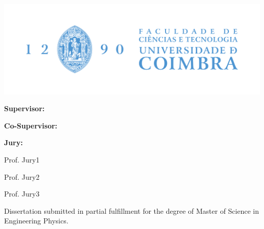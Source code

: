 \begin{titlepage}
    \begin{center}
    \includegraphics[width=\textwidth]{images/FCTUC_H_FundoClaro.png}
    
    \vspace{1cm}
    {\huge{\textbf{\thesistitle}}\par}
    
    \vspace{1cm}
    {\large{\textbf{Supervisor:}\\\supervisorname\par}}
    \vspace{5mm}
    {\large{\textbf{Co-Supervisor:}\\\cosupervisorname}}
    
    \vspace{1cm}
    {\large{\textbf{Jury:}
    
    Prof. Jury1
    
    Prof. Jury2
    
    Prof. Jury3
    
    }}
    
    \vfill
    Dissertation submitted in partial fulfillment for the degree of Master of Science in Engineering Physics.
    
    \vspace{0.5cm}
    {\large \statedate\par}    
    
    
    \end{center}
    \end{titlepage}